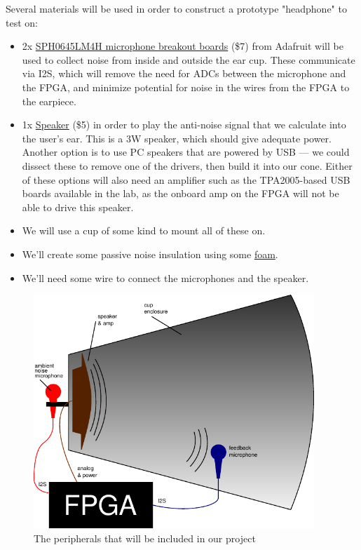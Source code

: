 \documentclass{fpgairpods}
\begin{document}
\begin{multicols}{2}
Several materials will be used in order to construct a prototype "headphone" to test on: 
\begin{itemize}
    \item 2x \href{https://www.adafruit.com/product/3421}{SPH0645LM4H microphone breakout boards} (\$7) from Adafruit will be used to collect noise from inside and outside the ear cup. These communicate via I2S, which will remove the need for ADCs between the microphone and the FPGA, and minimize potential for noise in the wires from the FPGA to the earpiece.
    \item 1x \href{https://www.adafruit.com/product/3968}{Speaker} (\$5) in order to play the anti-noise signal that we calculate into the user's ear. This is a 3W speaker, which should give adequate power. Another option is to use PC speakers that are powered by USB --- we could dissect these to remove one of the drivers, then build it into our cone. Either of these options will also need an amplifier such as the TPA2005-based USB boards available in the lab, as the onboard amp on the FPGA will not be able to drive this speaker.
    \item We will use a cup of some kind to mount all of these on.
    \item We'll create some passive noise insulation using some \href{https://www.amazon.com/Silverstone-21-Inch-Dampening-Acoustic-SF01/dp/B0040JHMH6?th=1}{foam}.
    \item We'll need some wire to connect the microphones and the speaker.
\end{itemize}

\end{multicols}


\begin{figure}[h]
\centering
\includegraphics[width=300pt]{./figs/system_diagram_with_text.pdf}
\caption{The peripherals that will be included in our project}
\label{fig:peripherals}
\end{figure}
\end{document}
